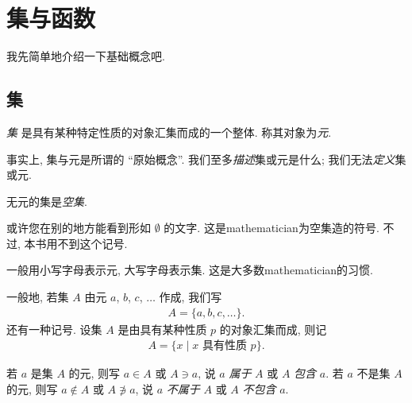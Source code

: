 \chapter{集与函数}

我先简单地介绍一下基础概念吧.

\section{集}

\begin{definition}
    \emph{集}%
    是具有某种特定性质的对象汇集而成的一个整体.
    称其对象为\emph{元}.
\end{definition}

\begin{remark}
    事实上, 集与元是所谓的 ``原始概念''.
    我们至多\emph{描述}集或元是什么;
    我们无法\emph{定义}集或元.
\end{remark}

\begin{definition}
    无元的集是\emph{空集}.
\end{definition}

\begin{remark}
    或许您在别的地方能看到形如 $\emptyset$ 的文字.
    这是\gls{mathematician}为空集造的符号.
    不过, 本书用不到这个记号.
\end{remark}

\begin{remark}
    一般用小写字母表示元, 大写字母表示集.
    这是大多数\gls{mathematician}的习惯.
\end{remark}

\begin{definition}
    一般地, 若集 $A$ 由元 $a$, $b$, $c$, $\dots$ 作成, 我们写
    \begin{align*}
        A = \{ a,b,c,\dots \}.
    \end{align*}
    还有一种记号.
    设集 $A$ 是由具有某种性质 $p$ 的对象汇集而成, 则记
    \begin{align*}
        A = \{ x \mid \text{$x$ 具有性质 $p$} \}.
    \end{align*}
\end{definition}

\begin{definition}
    若 $a$ 是集 $A$ 的元,
    则写 $a \in A$ 或 $A \ni a$,
    说 $a$ \emph{属于} $A$
    或 $A$ \emph{包含} $a$.
    若 $a$ 不是集 $A$ 的元,
    则写 $a \notin A$ 或 $A \not\ni a$,
    说 $a$ \emph{不属于} $A$
    或 $A$ \emph{不包含} $a$.
\end{definition}

